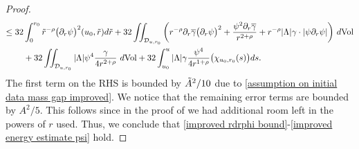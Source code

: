 \documentclass[11pt]{article}
\numberwithin{equation}{section}
\begin{document}
\begin{proof}
\begin{align*}
    \leq32&\int_0^{r_0}\Tilde{r}^{-\rho}\big(\partial_r\psi\big)^2(u_0,\Tilde{r})d\Tilde{r}+32\iint_{\mathcal{D}_{u,r_0}}\bigg(r^{-\rho}\partial_r\overline{\gamma}\big(\partial_r\psi\big)^2+\frac{\psi^2\partial_r\overline{\gamma}}{r^{2+\rho}}+r^{-\rho}|\Lambda|\gamma\cdot|\psi\partial_r\psi|\bigg)\ d\mathrm{Vol}\\
    &+32\iint_{\mathcal{D}_{u,r_0}}|\Lambda|\psi^4\frac{\gamma}{4r^{2+\rho}}\ d\mathrm{Vol}+32\int_{u_0}^u|\Lambda|\gamma\frac{\psi^4}{4r^{1+\rho}}\big(\chi_{u_0,r_0}(s)\big)ds.
\end{align*}
The first term on the RHS is bounded by $\Tilde{A}^2/10$ due to \eqref{assumption on initial data mass gap improved}. We notice that the remaining error terms are bounded by $A^2/5.$ This follows since in the proof of  we had additional room left in the powers of $r$ used. Thus, we conclude that \eqref{improved rdrphi bound}-\eqref{improved energy estimate psi} hold.
\end{proof}
\end{document}
